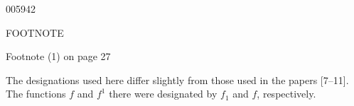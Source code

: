 \begin{scanpage}{0059}{42}
\begin{center}FOOTNOTE\end{center}
\begin{minipage}[t]{.46\linewidth}\vspace{0pt}Footnote (1) on page 27\end{minipage}\hfill\begin{minipage}[t]{.49\linewidth}\vspace{0pt}The designations used here differ slightly from those used in the papers [7--11]. The functions $f$ and $f^1$ there were designated by $f_1$ and $f$, respectively.\end{minipage}
\end{scanpage}
